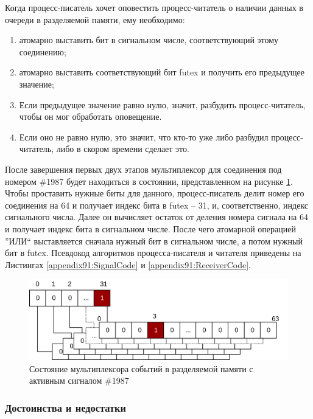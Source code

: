 Когда процесс-писатель хочет оповестить процесс-читатель о наличии данных в очереди в разделяемой памяти, ему необходимо:
\begin{enumerate}
\item атомарно выставить бит в сигнальном числе, соответствующий этому соединению;
\item атомарно выставить соответствующий бит futex и получить его предыдущее значение;
\item Если предыдущее значение равно нулю, значит, разбудить процесс-читатель, чтобы он мог обработать оповещение.
\item Если оно не равно нулю, это значит, что кто-то уже либо разбудил процесс-читатель, либо в скором времени сделает это.
\end{enumerate}

После завершения первых двух этапов мультиплексор для соединения под номером \#1987 будет находиться в состоянии, представленном на рисунке \ref{chapter31:Mux1987State}. Чтобы проставить нужные биты для данного, процесс-писатель делит номер его соединения на 64 и получает индекс бита в futex -- 31, и, соответственно, индекс сигнального числа. Далее он вычисляет остаток от деления номера сигнала на 64 и получает индекс бита в сигнальном числе. После чего атомарной операцией ''ИЛИ`` выставляется сначала нужный бит в сигнальном числе, а потом нужный бит в futex. Псевдокод алгоритмов процесса-писателя и читателя приведены на Листингах \ref{appendix91:SignalCode} и \ref{appendix91:ReceiverCode}.

\begin{figure}[!h]
\caption{Состояние мультиплексора событий в разделяемой памяти с активным сигналом \#1987}
\label{chapter31:Mux1987State}
\includegraphics[width=\textwidth]{../../graphics/schemes/futexready}
\end{figure}

\subsubsection{Достоинства и недостатки}

